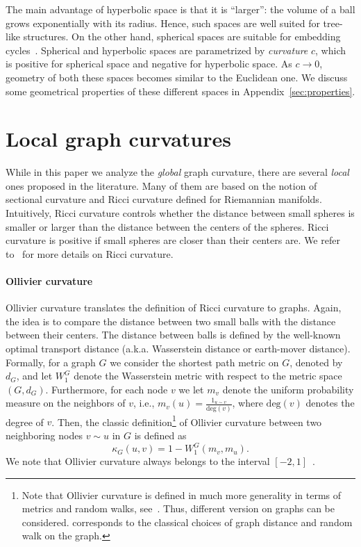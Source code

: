 \documentclass{article} %
\begin{document}
The main advantage of hyperbolic space is that it is ``larger'': the volume of a ball grows exponentially with its radius. Hence, such spaces are well suited for tree-like structures. On the other hand, spherical spaces are suitable for embedding cycles~\citep{gu2019learning}. Spherical and hyperbolic spaces are parametrized by \textit{curvature} $c$, which is positive for spherical space and negative for hyperbolic space. As $c \to 0$, geometry of both these spaces becomes similar to the Euclidean one. We discuss some geometrical properties of these different spaces in Appendix~\ref{sec:properties}.


\section{Local graph curvatures}

While in this paper we analyze the \textit{global} graph curvature, there are several \textit{local} ones proposed in the literature. Many of them are based on the notion of sectional curvature and Ricci curvature defined for Riemannian manifolds. Intuitively, Ricci curvature controls whether the distance between small spheres is smaller or larger than the distance between the centers of the spheres. Ricci curvature is positive if small spheres are closer than their centers are. We refer to~\citep{jost2009geometry,oneill1983semiriemannian} for more details on Ricci curvature.

\paragraph{Ollivier curvature}

Ollivier curvature translates the definition of Ricci curvature to graphs. Again, the idea is to compare the distance between two small balls with the distance between their centers. The distance between balls is defined by the well-known optimal transport distance (a.k.a. Wasserstein distance or earth-mover distance).
Formally, for a graph $G$ we consider the shortest path metric on $G$, denoted by $d_G$, and let $W_1^G$ denote the Wasserstein metric with respect to the metric space $(G,d_G)$. Furthermore, for each node $v$ we let $m_v$ denote the uniform probability measure on the neighbors of $v$, i.e., $m_v(u) = \frac{1_{u \sim v}}{\mathrm{deg}(v)}$, where $\mathrm{deg}(v)$ denotes the degree of $v$. Then, the classic definition\footnote{Note that Ollivier curvature is defined in much more generality in terms of metrics and random walks, see~\citep{ollivier2009ricci}. Thus, different version on graphs can be considered.  corresponds to the classical choices of graph distance and random walk on the graph.} of Ollivier curvature between two neighboring nodes $v \sim u$ in $G$ is defined as
\begin{equation}\label{eq:def_classic_ollivier_graphs}
	\kappa_G(u,v) = 1 - W_1^G(m_v, m_u).
\end{equation}
We note that Ollivier curvature always belongs to the interval $[-2,1]$~\citep{jost2014ollivier}.
\end{document}
